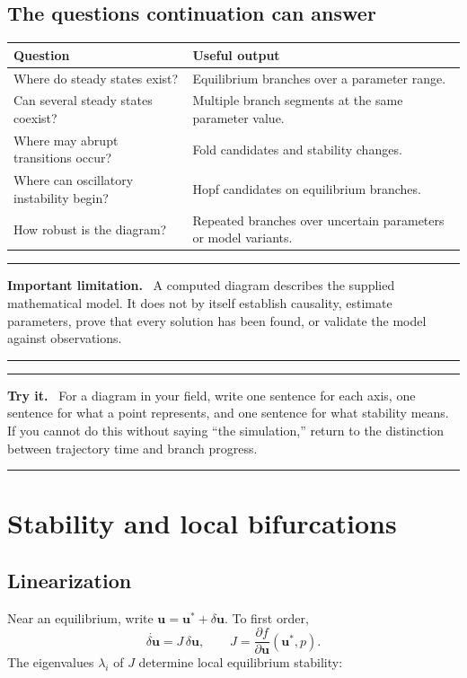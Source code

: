 \documentclass[11pt,oneside]{book}
\newcommand{\state}{\bm{u}}
\newcommand{\param}{p}
\newenvironment{warningbox}
  {\par\medskip\noindent\begin{minipage}{\textwidth}
   \color{JaxRed}\rule{\textwidth}{0.8pt}\par
   \textbf{Important limitation.}\ \color{black}}
  {\par\color{JaxRed}\rule{\textwidth}{0.8pt}
   \end{minipage}\par\medskip}
\newenvironment{trythis}
  {\par\medskip\noindent\begin{minipage}{\textwidth}
   \color{JaxTeal}\rule{\textwidth}{0.8pt}\par
   \textbf{Try it.}\ \color{black}}
  {\par\color{JaxTeal}\rule{\textwidth}{0.8pt}
   \end{minipage}\par\medskip}
\begin{document}
\section{The questions continuation can answer}

\begin{tabularx}{\textwidth}{>{\raggedright\arraybackslash}p{}X}
\toprule
Question & Useful output\\
\midrule
Where do steady states exist? & Equilibrium branches over a parameter range.\\
Can several steady states coexist? & Multiple branch segments at the same
parameter value.\\
Where may abrupt transitions occur? & Fold candidates and stability changes.\\
Where can oscillatory instability begin? & Hopf candidates on equilibrium
branches.\\
How robust is the diagram? & Repeated branches over uncertain parameters or
model variants.\\
\bottomrule
\end{tabularx}

\begin{warningbox}
A computed diagram describes the supplied mathematical model. It does not by
itself establish causality, estimate parameters, prove that every solution has
been found, or validate the model against observations.
\end{warningbox}

\begin{trythis}
For a diagram in your field, write one sentence for each axis, one sentence for
what a point represents, and one sentence for what stability means. If you
cannot do this without saying ``the simulation,'' return to the distinction
between trajectory time and branch progress.
\end{trythis}

\chapter{Stability and local bifurcations}

\section{Linearization}

Near an equilibrium, write $\state=\state^*+\delta\state$. To first order,
\[
  \dot{\delta\state}=J\,\delta\state,
  \qquad
  J=\frac{\partial f}{\partial\state}(\state^*,\param).
\]
The eigenvalues $\lambda_i$ of $J$ determine local equilibrium stability:
\end{document}
